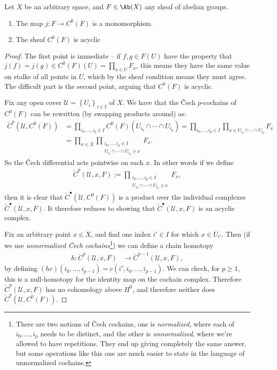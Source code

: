 \documentclass[11pt]{amsart}
\begin{document}
\begin{proposition}\label{prop:godement-sheaves-are-acyclic} 
Let $X$ be an arbitrary space, and $F\in \Ab(X)$ any sheaf of abelian groups.
\begin{enumerate}
    \item The map $j \colon F \to C^0(F)$ is a monomorphism.
    \item The sheaf $C^0(F)$ is acyclic
\end{enumerate}
\end{proposition}
\begin{proof} The first point is immediate -- if $f,g\in F(U)$ have the property that $j(f) = j(g) \in C^0(F)(U) = \prod_{x\in U}F_x$, this means they have the same value on stalks of all points in $U$, which by the sheaf condition means they must agree. The difficult part is the second point, arguing that $C^0(F)$ is acyclic.

Fix any open cover $\mathcal{U} = \left\{ U_i \right\}_{i\in I}$ of $X$. We have that the \v{C}ech $p$-cochains of $C^0(F)$ can be rewritten (by swapping products around) as:
\begin{align*}
    \check{C}^p(\mathcal{U},C^0(F)) &= \prod_{i_0, \ldots, i_p\in I} C^0(F)(U_{i_0} \cap \cdots \cap U_{i_p}) = \prod_{i_0, \ldots, i_p\in I}\prod_{x\in U_{i_0}\cap \cdots \cap U_{i_p}}F_x \\
    &= \prod_{x\in X} \prod_{\substack{i_0, \ldots, i_p\in I \\ U_{i_0}\cap \cdots \cap U_{i_p}\ni x}}F_x.
\end{align*}
So the \v{C}ech differential acts pointwise on each $x$. In other words if we define
\begin{align*}
    \check{C}^p(\mathcal{U},x,F) := \prod_{\substack{i_0, \ldots, i_p\in I \\ U_{i_0}\cap \cdots \cap U_{i_p}\ni x}}F_x,
\end{align*}
then it is clear that $\check{C}^\bullet(\mathcal{U},C^0(F))$ is a product over the individual complexes $\check{C}^\bullet(\mathcal{U},x,F)$. It therefore reduces to showing that $\check{C}^\bullet(\mathcal{U},x,F)$ is an acyclic complex.

Fix an arbitrary point $x\in X$, and find one index $i'\in I$ for which $x\in U_{i'}$. Then (if we use \emph{unnormalized \v{C}ech cochains}\footnote{There are two notions of \v{C}ech cochains, one is \emph{normalized}, where each of $i_0, \ldots, i_p$ needs to be distinct, and the other is \emph{unnormalized}, where we're allowed to have repetitions. They end up giving completely the same answer, but some operations like this one are much easier to state in the language of unnormalized cochains.}) we can define a chain homotopy
\begin{align*}
    h \colon \check{C}^p(\mathcal{U},x,F) &\to \check{C}^{p-1}(\mathcal{U},x,F),
\end{align*}
by defining $(hc)(i_0, \ldots, i_{p-1}) = c(i',i_0, \ldots, i_{p-1})$. We can check, for $p\ge1$, this is a null-homotopy for the identity map on the cochain complex. Therefore $\check{C}^p(\mathcal{U},x,F)$ has no cohomology above $H^0$, and therefore neither does $\check{C}^p(\mathcal{U},C^0(F))$.
\end{proof}
\end{document}
